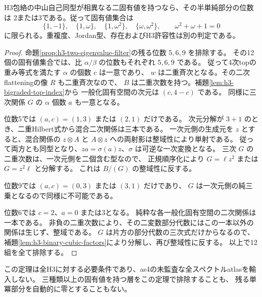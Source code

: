 \begin{theorem}
\label{thm:h3-two-eigenvalue-refined}
H3包絡の中山自己同型が相異なる二固有値を持つなら、その半単純部分の位数は
2または3である。従って固有値集合は
\[
 \{1,-1\},\quad \{1,\omega\},\quad\{1,\omega^2\},\quad\{\omega,\omega^2\},
 \qquad \omega^2+\omega+1=0
\]
に限られる。重複度、Jordan型、存在およびH3許容性は別の判定である。
\end{theorem}
\begin{proof}
命題\ref{prop:h3-two-eigenvalue-filter}の残る位数 $5,6,9$ を排除する。
その12個の固有値集合では、比 $\alpha/\beta$ の位数もそれぞれ $5,6,9$ である。
従って4次topの重み等式を満たす $\alpha$ の個数 $c$ は一意であり、
$w$ は二重斉次となる。その二次flatteningの像 $R$ も二重斉次なので、
$B$ は二重次数を持つ。補題\ref{lem:h3-bigraded-top-index}から
一般化固有空間の次元は $(c,4-c)$ である。
同様に三次関係 $G$ の $\alpha$ 個数 $a$ も一意となる。

位数5では $(a,c)=(1,3)$ または $(2,1)$ だけである。
次元分解が $3+1$ のとき、二重Hilbert式から混合二次関係は三本である。
一次元側の生成元を $z$ とすると、混合関係の
$z\otimes A$ と $A\otimes z$ への両射影は整域性により単射である。
従って両方とも同型となり、$za=\sigma(a)z$、$\sigma$ は可逆な一次変換となる。
三次 $G$ の二重次数は、一次元側を二個含む型なので、
正規順序化により $G=\ell z^2$ または $G=z^2\ell$ と分解する。
これは $B/(G)$ の整域性に反する。

位数9では $(a,c)=(0,3)$ または $(3,1)$ だけであり、
$G$ は一次元側の純三乗となるので同様に不可能である。

位数6では $c=2$、$a=0$ または3となる。
純粋な各一般化固有空間の二次関係は一本である。
非負の二重次数により、その二変数部分代数にはこの一本以外の関係は生じず、整域である。
$G$ は片方の部分代数の三次式だけからなるので、
補題\ref{lem:h3-binary-cubic-factors}により分解し、再び整域性に反する。
以上で12組を全て排除する。
\end{proof}
この定理は全H3に対する必要条件であり、as4の未監査な全スペクトルatlasを輸入しない。
三種類以上の固有値を持つ層をこの定理で排除することも、
残る単冪部分を自動的に零とすることもない。

